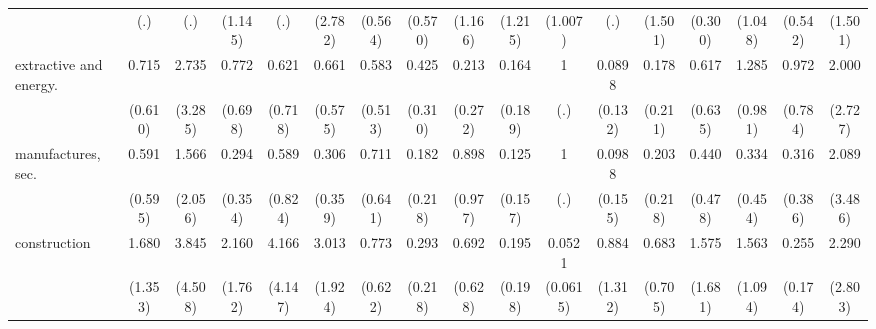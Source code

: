 {\begin{tabular}{l*{16}{c}}
                    &         (.)         &         (.)         &     (1.145)         &         (.)         &     (2.782)         &     (0.564)         &     (0.570)         &     (1.166)         &     (1.215)         &     (1.007)         &         (.)         &     (1.501)         &     (0.300)         &     (1.048)         &     (0.542)         &     (1.501)         \\
[1em]
extractive and energy.&       0.715         &       2.735         &       0.772         &       0.621         &       0.661         &       0.583         &       0.425         &       0.213         &       0.164         &           1         &      0.0898         &       0.178         &       0.617         &       1.285         &       0.972         &       2.000         \\
                    &     (0.610)         &     (3.285)         &     (0.698)         &     (0.718)         &     (0.575)         &     (0.513)         &     (0.310)         &     (0.272)         &     (0.189)         &         (.)         &     (0.132)         &     (0.211)         &     (0.635)         &     (0.981)         &     (0.784)         &     (2.727)         \\
[1em]
manufactures, sec.  &       0.591         &       1.566         &       0.294         &       0.589         &       0.306         &       0.711         &       0.182         &       0.898         &       0.125         &           1         &      0.0988         &       0.203         &       0.440         &       0.334         &       0.316         &       2.089         \\
                    &     (0.595)         &     (2.056)         &     (0.354)         &     (0.824)         &     (0.359)         &     (0.641)         &     (0.218)         &     (0.977)         &     (0.157)         &         (.)         &     (0.155)         &     (0.218)         &     (0.478)         &     (0.454)         &     (0.386)         &     (3.486)         \\
[1em]
construction        &       1.680         &       3.845         &       2.160         &       4.166         &       3.013         &       0.773         &       0.293         &       0.692         &       0.195         &      0.0521\sym{*}  &       0.884         &       0.683         &       1.575         &       1.563         &       0.255\sym{*}  &       2.290         \\
                    &     (1.353)         &     (4.508)         &     (1.762)         &     (4.147)         &     (1.924)         &     (0.622)         &     (0.218)         &     (0.628)         &     (0.198)         &    (0.0615)         &     (1.312)         &     (0.705)         &     (1.681)         &     (1.094)         &     (0.174)         &     (2.803)         \\

\end{tabular}}

